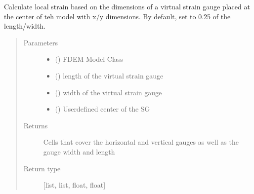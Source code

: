 \documentclass[letterpaper,10pt,english]{sphinxmanual}
\begin{document}
\begin{fulllineitems}
\label{\detokenize{openfdem:openfdem.complete_UCS_thread_pool_generators.set_strain_gauge}}
Calculate local strain based on the dimensions of a virtual strain gauge placed at the center of teh model with
x/y dimensions. By default, set to 0.25 of the length/width.
\begin{quote}\begin{description}
\item[{Parameters}] \leavevmode\begin{itemize}
\item {} 
 ({\hyperref[\detokenize{openfdem:openfdem.openfdem.Model}]{}}) \textendash{} FDEM Model Class

\item {} 
 () \textendash{} length of the virtual strain gauge

\item {} 
 () \textendash{} width of the virtual strain gauge

\item {} 
 (\sphinxstyleliteralemphasis{\sphinxupquote{{[}}}\sphinxstyleliteralemphasis{\sphinxupquote{, }}\sphinxstyleliteralemphasis{\sphinxupquote{, }}\sphinxstyleliteralemphasis{\sphinxupquote{{]}}}) \textendash{} User\sphinxhyphen{}defined center of the SG

\end{itemize}

\item[{Returns}] \leavevmode
Cells that cover the horizontal and vertical gauges as well as the gauge width and length

\item[{Return type}] \leavevmode
{[}list, list, float, float{]}

\end{description}\end{quote}

\end{fulllineitems}
\end{document}
